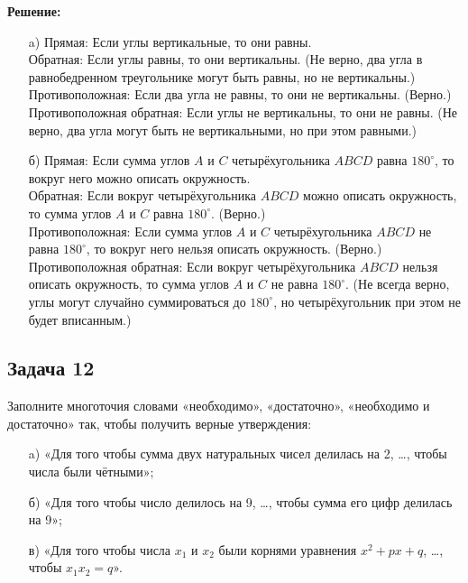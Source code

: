 \documentclass[a4paper,12pt]{article}
\begin{document}
\textbf{Решение:}
\begin{itemize}
    \item[a)] Прямая: Если углы вертикальные, то они равны.\\
    Обратная: Если углы равны, то они вертикальны. (Не верно, два угла в равнобедренном треугольнике могут быть равны, но не вертикальны.)\\
    Противоположная: Если два угла не равны, то они не вертикальны. (Верно.)\\
    Противоположная обратная: Если углы не вертикальны, то они не равны. (Не верно, два угла могут быть не вертикальными, но при этом равными.)
    \vspace{1cm}

    \item[б)] Прямая: Если сумма углов \(A\) и \(C\) четырёхугольника \(ABCD\) равна \(180^\circ\), то вокруг него можно описать окружность.\\
    Обратная: Если вокруг четырёхугольника \(ABCD\) можно описать окружность, то сумма углов \(A\) и \(C\) равна \(180^\circ\). (Верно.)\\
    Противоположная: Если сумма углов \(A\) и \(C\) четырёхугольника \(ABCD\) не равна \(180^\circ\), то вокруг него нельзя описать окружность. (Верно.)\\
    Противоположная обратная: Если вокруг четырёхугольника \(ABCD\) нельзя описать окружность, то сумма углов \(A\) и \(C\) не равна \(180^\circ\). (Не всегда верно, углы могут случайно суммироваться до \(180^\circ\), но четырёхугольник при этом не будет вписанным.)
\end{itemize}
\vspace{1cm}

\subsection{Задача 12}
Заполните многоточия словами «необходимо», «достаточно», «необходимо и достаточно» так, чтобы получить верные утверждения:
\begin{itemize}
    \item[a)] «Для того чтобы сумма двух натуральных чисел делилась на 2, \ldots, чтобы числа были чётными»;
    \item[б)] «Для того чтобы число делилось на 9, \ldots, чтобы сумма его цифр делилась на 9»;
    \item[в)] «Для того чтобы числа \(x_1\) и \(x_2\) были корнями уравнения \(x^2 + px + q\), \ldots, чтобы \(x_1 x_2 = q\)».
\end{itemize}
\end{document}

